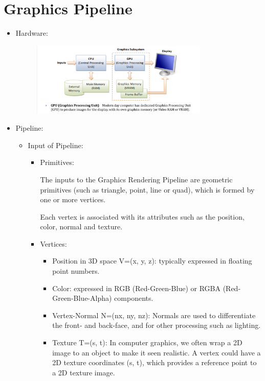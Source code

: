 \documentclass{article}
\begin{document}
\section{Graphics Pipeline}
\begin{itemize}
\item Hardware:
\begin{figure}[H]
    \centering
    \includegraphics[width=0.8\textwidth]{imgs/hardware.jpeg}
\end{figure}

    \item Pipeline:

\begin{itemize}
    \item Input of Pipeline:
\begin{itemize}
    \item Primitives: 
    
    The inputs to the Graphics Rendering Pipeline are geometric primitives (such as triangle, point, line or quad), which is formed by one or more vertices.

Each vertex is associated with its attributes such as the position, color, normal and texture.
    \item Vertices:  
    
    \begin{itemize}
        \item 

    Position in 3D space V=(x, y, z): typically expressed in floating point numbers.

\item
Color: expressed in RGB (Red-Green-Blue) or RGBA (Red-Green-Blue-Alpha) components. 

\item 
Vertex-Normal N=(nx, ny, nz): Normals are used to differentiate the front- and back-face, and for other processing such as lighting.
\item 
Texture T=(s, t): In computer graphics, we often wrap a 2D image to an object to make it seen realistic. A vertex could have a 2D texture coordinates (s, t), which provides a reference point to a 2D texture image.


\end{itemize}
\end{itemize}
\end{itemize}
\end{itemize}
\end{document}
